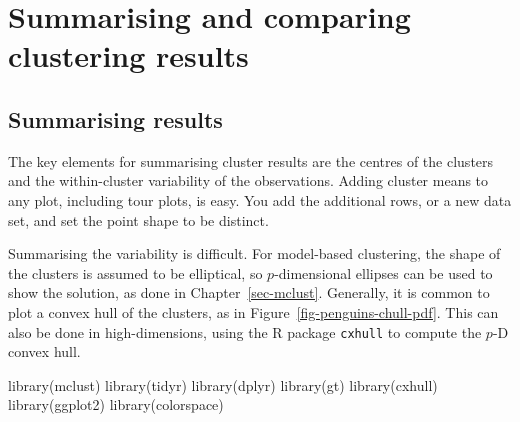 \documentclass[
  letterpaper,
]{krantz}
\newenvironment{Shaded}{\begin{snugshade}}{\end{snugshade}}
\newcommand{\FunctionTok}[1]{\textcolor[rgb]{0.28,0.35,0.67}{#1}}
\newcommand{\NormalTok}[1]{\textcolor[rgb]{0.00,0.23,0.31}{#1}}
\begin{document}

\chapter{Summarising and comparing clustering
results}\label{sec-clust-compare}


\section{Summarising results}\label{summarising-results}

The key elements for summarising cluster results are the centres of the
clusters and the within-cluster variability of the observations. Adding
cluster means to any plot, including tour plots, is easy. You add the
additional rows, or a new data set, and set the point shape to be
distinct.

Summarising the variability is difficult. For model-based clustering,
the shape of the clusters is assumed to be elliptical, so
\(p\)-dimensional ellipses can be used to show the solution, as done in
Chapter~\ref{sec-mclust}. Generally, it is common to plot a convex hull
of the clusters, as in Figure~\ref{fig-penguins-chull-pdf}. This can
also be done in high-dimensions, using the R package \texttt{cxhull} to
compute the \(p\)-D convex hull.

\begin{Shaded}
\begin{Highlighting}[]
\FunctionTok{library}\NormalTok{(mclust) }
\FunctionTok{library}\NormalTok{(tidyr)}
\FunctionTok{library}\NormalTok{(dplyr)}
\FunctionTok{library}\NormalTok{(gt)}
\FunctionTok{library}\NormalTok{(cxhull)}
\FunctionTok{library}\NormalTok{(ggplot2)}
\FunctionTok{library}\NormalTok{(colorspace)}
\end{Highlighting}
\end{Shaded}
\end{document}
